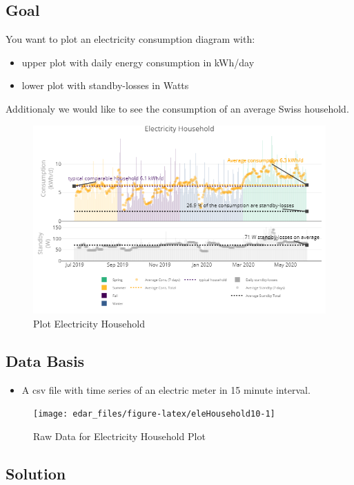 \documentclass[
  a4paperpaper,
]{book}
\providecommand{\tightlist}{%
  \setlength{\itemsep}{0pt}\setlength{\parskip}{0pt}}
\begin{document}
\hypertarget{goal-16}{%
\subsection{Goal}\label{goal-16}}

You want to plot an electricity consumption diagram with:

\begin{itemize}
\tightlist
\item
  upper plot with daily energy consumption in kWh/day
\item
  lower plot with standby-losses in Watts
\end{itemize}

Additionaly we would like to see the consumption of an average Swiss household.

\begin{figure}
\includegraphics[width=0.7\linewidth]{images/eleHousehold} \caption{Plot Electricity Household}\label{fig:unnamed-chunk-25}
\end{figure}

\hypertarget{data-basis-16}{%
\subsection{Data Basis}\label{data-basis-16}}

\begin{itemize}
\tightlist
\item
  A csv file with time series of an electric meter in 15 minute interval.
\end{itemize}

\begin{figure}
\texttt{[image: edar\_files/figure-latex/eleHousehold10-1]} \caption{Raw Data for Electricity Household Plot}\label{fig:eleHousehold10}
\end{figure}

\newpage

\hypertarget{solution-16}{%
\subsection{Solution}\label{solution-16}}
\end{document}
